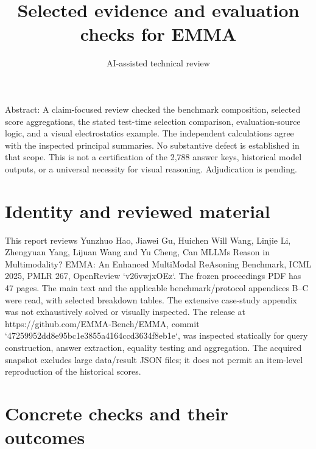 \documentclass[10pt]{article}
\title{Selected evidence and evaluation checks for EMMA}
\author{AI-assisted technical review}
\date{}
\begin{document}
\maketitle
Abstract: A claim-focused review checked the benchmark composition, selected score aggregations, the stated test-time selection comparison, evaluation-source logic, and a visual electrostatics example. The independent calculations agree with the inspected principal summaries. No substantive defect is established in that scope. This is not a certification of the 2,788 answer keys, historical model outputs, or a universal necessity for visual reasoning. Adjudication is pending.\par
\section*{Identity and reviewed material}
This report reviews Yunzhuo Hao, Jiawei Gu, Huichen Will Wang, Linjie Li, Zhengyuan Yang, Lijuan Wang and Yu Cheng, Can MLLMs Reason in Multimodality? EMMA: An Enhanced MultiModal ReAsoning Benchmark, ICML 2025, PMLR 267, OpenReview `v26vwjxOEz`. The frozen proceedings PDF has 47 pages. The main text and the applicable benchmark/protocol appendices B–C were read, with selected breakdown tables. The extensive case-study appendix was not exhaustively solved or visually inspected. The release at https://github.com/EMMA-Bench/EMMA, commit `47259952dd8e95bc1e3855a4164ccd3634f8eb1e`, was inspected statically for query construction, answer extraction, equality testing and aggregation. The acquired snapshot excludes large data/result JSON files; it does not permit an item-level reproduction of the historical scores.\par
\section*{Concrete checks and their outcomes}
\end{document}
